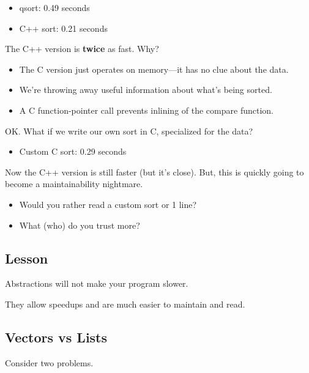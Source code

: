 \begin{itemize}
\item qsort: 0.49 seconds
\item C++ sort: 0.21 seconds
\end{itemize}

The C++ version is {\bf twice} as fast. Why?
      \begin{itemize}
        \item The C version just operates on memory---it has no clue about the
          data.
        \item We're throwing away useful information about what's being sorted.
        \item A C function-pointer call prevents inlining of the compare function.
      \end{itemize}
OK. What if we write our own sort in C, specialized for the data?

\begin{itemize}
\item Custom C sort: 0.29 seconds
\end{itemize}

Now the C++ version is still faster (but it's close). But, this is
quickly going to become a maintainability nightmare.
      \begin{itemize}
        \item Would you rather read a custom sort or 1 line?
        \item What (who) do you trust more?
      \end{itemize}

\subsection*{Lesson}
Abstractions will not make your program slower. 

\noindent
They allow speedups and are much easier to maintain and read.

\subsection*{Vectors vs Lists}
Consider two
problems.

